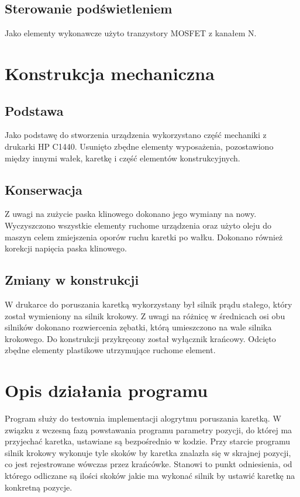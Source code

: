 \documentclass[10pt, a4paper]{article}
\begin{document}
\subsection{Sterowanie podświetleniem}
Jako elementy wykonawcze użyto tranzystory MOSFET z kanałem N.



\section{Konstrukcja mechaniczna}

\subsection{Podstawa}
Jako podstawę do stworzenia urządzenia wykorzystano część mechaniki z drukarki HP C1440. Usunięto zbędne elementy wyposażenia, pozostawiono między innymi wałek, karetkę i część elementów konstrukcyjnych.


\subsection{Konserwacja}
Z uwagi na zużycie paska klinowego dokonano jego wymiany na nowy. Wyczyszczono wszystkie elementy ruchome urządzenia oraz użyto oleju do maszyn celem zmiejszenia oporów ruchu karetki po wałku. Dokonano również korekcji napięcia paska klinowego. 

\subsection{Zmiany w konstrukcji}
W drukarce do poruszania karetką wykorzystany był silnik prądu stałego, który został wymieniony na silnik krokowy. Z uwagi na różnicę w średnicach osi obu silników dokonano rozwiercenia zębatki, którą umieszczono na wale silnika krokowego. Do konstrukcji przykręcony został wyłącznik krańcowy.
Odcięto zbędne elementy plastikowe utrzymujące ruchome element.




\section{Opis działania programu}

Program służy do testownia implementacji alogrytmu poruszania karetką. W związku z wczesną fazą powstawania programu parametry pozycji, do której ma przyjechać karetka, ustawiane są bezpośrednio w kodzie. Przy starcie programu silnik krokowy wykonuje tyle skoków by karetka znalazła się w skrajnej pozycji, co jest rejestrowane wówczas przez krańcówke. Stanowi to punkt odniesienia, od którego odliczane są ilości skoków jakie ma wykonać silnik by ustawić karetkę na konkretną pozycje. 
\end{document}
